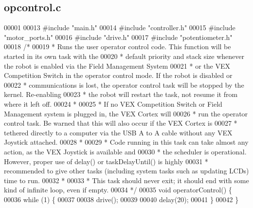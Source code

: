 \subsection{opcontrol.\+c}
\label{opcontrol_8c_source}

\begin{DoxyCode}
00001 
00013 \textcolor{preprocessor}{#include "main.h"}
00014 \textcolor{preprocessor}{#include "controller.h"}
00015 \textcolor{preprocessor}{#include "motor_ports.h"}
00016 \textcolor{preprocessor}{#include "drive.h"}
00017 \textcolor{preprocessor}{#include "potentiometer.h"}
00018 \textcolor{comment}{/*}
00019 \textcolor{comment}{ * Runs the user operator control code. This function will be started in its own task with the}
00020 \textcolor{comment}{ * default priority and stack size whenever the robot is enabled via the Field Management System}
00021 \textcolor{comment}{ * or the VEX Competition Switch in the operator control mode. If the robot is disabled or}
00022 \textcolor{comment}{ * communications is lost, the operator control task will be stopped by the kernel. Re-enabling}
00023 \textcolor{comment}{ * the robot will restart the task, not resume it from where it left off.}
00024 \textcolor{comment}{ *}
00025 \textcolor{comment}{ * If no VEX Competition Switch or Field Management system is plugged in, the VEX Cortex will}
00026 \textcolor{comment}{ * run the operator control task. Be warned that this will also occur if the VEX Cortex is}
00027 \textcolor{comment}{ * tethered directly to a computer via the USB A to A cable without any VEX Joystick attached.}
00028 \textcolor{comment}{ *}
00029 \textcolor{comment}{ * Code running in this task can take almost any action, as the VEX Joystick is available and}
00030 \textcolor{comment}{ * the scheduler is operational. However, proper use of delay() or taskDelayUntil() is highly}
00031 \textcolor{comment}{ * recommended to give other tasks (including system tasks such as updating LCDs) time to run.}
00032 \textcolor{comment}{ *}
00033 \textcolor{comment}{ * This task should never exit; it should end with some kind of infinite loop, even if empty.}
00034 \textcolor{comment}{ */}
00035 \textcolor{keywordtype}{void} operatorControl() \{
00036        \textcolor{keywordflow}{while} (1) \{
00037 
00038               drive();
00039 
00040               delay(20);
00041        \}
00042 \}
\end{DoxyCode}
